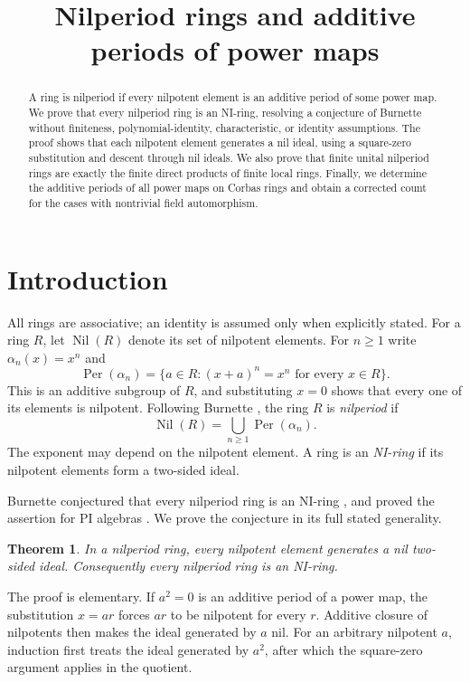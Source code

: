 \documentclass[11pt]{article}
\title{Nilperiod rings and additive periods of power maps}
\author{}
\date{}
\newtheorem{theorem}{Theorem}
\theoremstyle{remark}
\DeclareMathOperator{\Nil}{Nil}
\DeclareMathOperator{\Per}{Per}
\begin{document}
\maketitle
\begin{abstract}
A ring is nilperiod if every nilpotent element is an additive period of some
power map. We prove that every nilperiod ring is an NI-ring, resolving a
conjecture of Burnette without finiteness, polynomial-identity, characteristic,
or identity assumptions. The proof shows that each nilpotent element generates
a nil ideal, using a square-zero substitution and descent through nil ideals.
We also prove that finite unital nilperiod rings are exactly the finite direct
products of finite local rings. Finally, we determine the additive periods of
all power maps on Corbas rings and obtain a corrected count for the cases with
nontrivial field automorphism.
\end{abstract}

\section{Introduction}
All rings are associative; an identity is assumed only when explicitly stated.
For a ring $R$, let $\Nil(R)$ denote its set of nilpotent elements. For $n\geq1$
write $\alpha_n(x)=x^n$ and
\[
 \Per(\alpha_n)=\{a\in R:(x+a)^n=x^n\text{ for every }x\in R\}.
\]
This is an additive subgroup of $R$, and substituting $x=0$ shows that every
one of its elements is nilpotent. Following Burnette \cite{Burnette}, the
ring $R$ is \emph{nilperiod} if
\[
 \Nil(R)=\bigcup_{n\geq1}\Per(\alpha_n).
\]
The exponent may depend on the nilpotent element. A ring is an \emph{NI-ring}
if its nilpotent elements form a two-sided ideal.

Burnette conjectured that every nilperiod ring is an NI-ring
\cite[Conjecture~2.6]{Burnette}, and proved the assertion for PI algebras
\cite[Theorem~2.9]{Burnette}. We prove the conjecture in its full stated
generality.

\begin{theorem}\label{thm:main}
In a nilperiod ring, every nilpotent element generates a nil two-sided ideal.
Consequently every nilperiod ring is an NI-ring.
\end{theorem}

The proof is elementary. If $a^2=0$ is an additive period of a power map,
the substitution $x=ar$ forces $ar$ to be nilpotent for every $r$.
Additive closure of nilpotents then makes the ideal generated by $a$ nil.
For an arbitrary nilpotent $a$, induction first treats the ideal generated
by $a^2$, after which the square-zero argument applies in the quotient.
\end{document}
